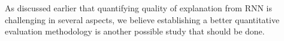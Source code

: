 As discussed earlier that quantifying quality of explanation from RNN is challenging in several aspects, we believe establishing a better quantitative evaluation methodology is another possible study that should be done.

%
%
%
%
